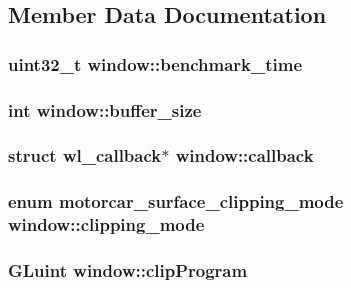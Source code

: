 \subsection{Member Data Documentation}
\hypertarget{structwindow_a72629bf021a361ad900504732a74cb68}{
\subsubsection[{benchmark\-\_\-time}]{\setlength{\rightskip}{0pt plus 5cm}uint32\-\_\-t window\-::benchmark\-\_\-time}}\label{structwindow_a72629bf021a361ad900504732a74cb68}
\hypertarget{structwindow_a0e634038f669aff472012f25ea250b40}{
\subsubsection[{buffer\-\_\-size}]{\setlength{\rightskip}{0pt plus 5cm}int window\-::buffer\-\_\-size}}\label{structwindow_a0e634038f669aff472012f25ea250b40}
\hypertarget{structwindow_a35ba639556fa19d9273dad0953a6807e}{
\subsubsection[{callback}]{\setlength{\rightskip}{0pt plus 5cm}struct wl\-\_\-callback$\ast$ window\-::callback}}\label{structwindow_a35ba639556fa19d9273dad0953a6807e}
\hypertarget{structwindow_afd815498a7d31f3547853444970a3791}{
\subsubsection[{clipping\-\_\-mode}]{\setlength{\rightskip}{0pt plus 5cm}enum {\bf motorcar\-\_\-surface\-\_\-clipping\-\_\-mode} window\-::clipping\-\_\-mode}}\label{structwindow_afd815498a7d31f3547853444970a3791}
\hypertarget{structwindow_adc05c7be01b19a77722ce274ec53e93b}{
\subsubsection[{clip\-Program}]{\setlength{\rightskip}{0pt plus 5cm}G\-Luint window\-::clip\-Program}}\label{structwindow_adc05c7be01b19a77722ce274ec53e93b}
